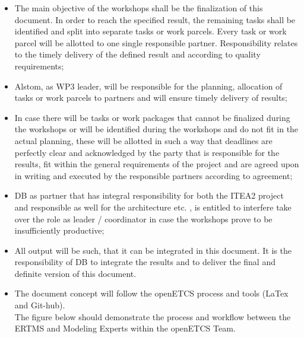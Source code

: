 \begin{itemize}
\item The main objective of the workshops shall be the finalization of this document. In order to reach the specified result, the remaining tasks shall be identified and split into separate tasks or work parcels. Every task or work parcel will be allotted to one single responsible partner. Responsibility relates to the timely delivery of the defined result and according to quality requirements;\\
\item Alstom, as WP3 leader, will be responsible for the planning, allocation of tasks or work parcels to partners and will ensure timely delivery of results;\\
\item In case there will be tasks or work packages that cannot be finalized during the workshops or will be identified during the workshops and do not fit in the actual planning, these will be allotted in such a way that deadlines are perfectly clear and acknowledged by the party that is responsible for the results, fit within the general requirements of the project and are agreed upon in writing and executed by the responsible partners according to agreement;\\
\item DB as partner that has integral responsibility for both the ITEA2 project and responsible as well for the architecture etc. , is entitled to interfere take over the role as leader / coordinator in case the workshops prove to be insufficiently productive;\\
\item All output will be such, that it can be integrated in this document. It is the responsibility of DB to integrate the results and to deliver the final and definite version of this document. \\
\item The document concept will follow the openETCS process and tools (LaTex and Git-hub).\\

The figure below should demonstrate the process and workflow between the ERTMS and Modeling Experts within the openETCS Team.\\
\end{itemize}


